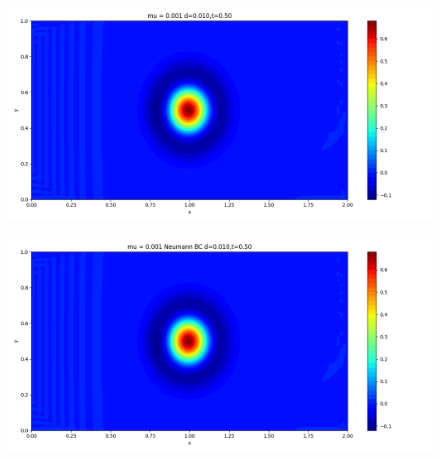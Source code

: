 \documentclass[12pt]{article}
\begin{document}
\begin{figure}[H]
\begin{minipage}{\linewidth}
\begin{minipage}{0.5\textwidth}
\includegraphics[width=\linewidth]{figuresmu/mu3d0.010t0.50.png}
\label{fig3}
\end{minipage}\hfill
\begin{minipage}{0.5\textwidth}
\includegraphics[width=\linewidth]{figuresmu/mu3Nud0.010t0.50.png}
\label{fig4}
\end{minipage}
\vspace{-1.5em}


\end{minipage}
\end{figure}
\end{document}

